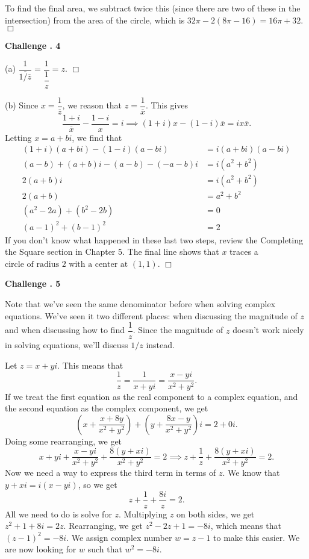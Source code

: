 \documentclass[lang=en,11pt]{elegantbook}
\begin{document}
To find the final area, we subtract twice this (since there are two of these in the intersection) from the area of the circle, which is $32\pi-2(8\pi-16)=\boxed{16\pi+32}.$ $\Box$\vspace{3mm}

\noindent \textbf{Challenge . 4}

(a) $\displaystyle \dfrac{1}{\overline{1/\overline{z}}}=\dfrac{1}{\dfrac{1}{z}}=\boxed{z}$. $\Box$

(b) Since $x=\dfrac{1}{\overline{z}}$, we reason that $z=\dfrac{1}{\overline{x}}$.  This gives $$\dfrac{1+i}{\overline{x}}-\dfrac{1-i}{x}=i \implies (1+i)x-(1-i)\overline{x}=ix\overline{x}.$$
Letting $x=a+bi$, we find that \begin{align*}
    (1+i)(a+bi)-(1-i)(a-bi)&=i(a+bi)(a-bi) \\
    (a-b)+(a+b)i-(a-b)-(-a-b)i&=i(a^2+b^2) \\
    2(a+b)i&=i(a^2+b^2) \\
    2(a+b)&=a^2+b^2 \\
    (a^2-2a)+(b^2-2b)&=0 \\
    (a-1)^2+(b-1)^2&=2
\end{align*}
If you don't know what happened in these last two steps, review the Completing the Square section in Chapter 5.  The final line shows that $x$ traces a $\boxed{\text{circle of radius } 2 \text{ with a center at } (1,1)}.$  $\Box$\vspace{3mm}

\noindent \textbf{Challenge . 5}

Note that we've seen the same denominator before when solving complex equations.  We've seen it two different places: when discussing the magnitude of $z$ and when discussing how to find $\dfrac{1}{z}$.  Since the magnitude of $z$ doesn't work nicely in solving equations, we'll discuss $1/z$ instead.

Let $z=x+yi$.  This means that $$\dfrac{1}{z}=\dfrac{1}{x+yi}=\dfrac{x-yi}{x^2+y^2}.$$  If we treat the first equation as the real component to a complex equation, and the second equation as the complex component, we get $$\left(x+\dfrac{x+8y}{x^2+y^2}\right)+\left(y+\dfrac{8x-y}{x^2+y^2}\right)i=2+0i.$$ Doing some rearranging, we get $$x+yi+\dfrac{x-yi}{x^2+y^2}+\dfrac{8(y+xi)}{x^2+y^2}=2 \implies z+\dfrac{1}{z}+\dfrac{8(y+xi)}{x^2+y^2}=2.$$
Now we need a way to express the third term in terms of $z$.  We know that $y+xi=i(x-yi)$, so we get $$z+\dfrac{1}{z}+\dfrac{8i}{z}=2.$$  All we need to do is solve for $z$.  Multiplying $z$ on both sides, we get $z^2+1+8i=2z$.  Rearranging, we get $z^2-2z+1=-8i$, which means that $(z-1)^2=-8i$.  We assign complex number $w=z-1$ to make this easier.  We are now looking for $w$ such that $w^2=-8i$.
\end{document}
